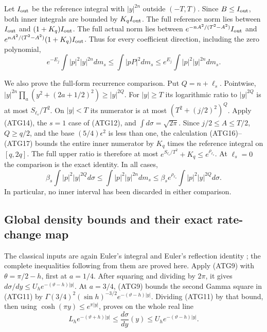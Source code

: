\documentclass[11pt,a4paper]{article}
\begin{document}
Let $I_{\rm out}$ be the reference integral with $|y|^{2n}$
outside $(-T,T)$. Since $B\le I_{\rm out}$, both inner integrals
are bounded by $K_q I_{\rm out}$. The full reference norm lies
between $I_{\rm out}$ and $(1+K_q)I_{\rm out}$.
The full actual norm lies between
$e^{-nA^2/(T^2-A^2)}I_{\rm out}$ and
$e^{nA^2/(T^2-A^2)}(1+K_q)I_{\rm out}$.
Thus for every coefficient direction, including the zero polynomial,
\[
 e^{-E_j}\int|p|^2|y|^{2n}dm_s
 \le\int|pP|^2dm_s
 \le e^{E_j}\int|p|^2|y|^{2n}dm_s.
\tag{ATG18}
\]

We also prove the full-form recurrence comparison. Put $Q=n+\ell_s$.
Pointwise,
$|y|^{2n}\prod_a(y^2+(2a+1/2)^2)\ge |y|^{2Q}$.
For $|y|\ge T$ its logarithmic ratio to $|y|^{2Q}$ is at most
$S_{\ell_s}/T^2$. On $|y|<T$ its numerator is at most
$(T^2+(j/2)^2)^Q$.
Apply (ATG14), the $s=1$ case of (ATG12), and
$\int d\sigma=\sqrt{2\pi}$. Since $j/2\le A\le T/2$,
$Q\ge q/2$, and the base $(5/4)\epsilon^2$ is less than one,
the calculation (ATG16)--(ATG17) bounds the entire inner numerator
by $K_q$ times the reference integral on $[q,2q]$.
The full upper ratio is therefore at most
$e^{S_{\ell_s}/T^2}+K_q\le e^{\rho_{\ell_s}}$.
At $\ell_s=0$ the comparison is the exact identity. In all cases,
\[
 \beta_s\int|p|^2|y|^{2Q}d\sigma
 \le\int|p|^2|y|^{2n}dm_s
 \le\beta_s e^{\rho_{\ell_s}}\int|p|^2|y|^{2Q}d\sigma.
\tag{ATG19}
\]
In particular, no inner interval has been discarded in either
comparison.

\subsection{Global density bounds and their exact rate-change map}

The classical inputs are again Euler's integral and Euler's
reflection identity \cite[eqs.~(5.2.1), (5.5.3)]{human:dlmf5};
the complete inequalities following from them are proved here.
Apply (ATG9) with $\theta=\pi/2-h$, first at $a=1/4$.
After squaring and dividing by $2\pi$, it gives
$d\sigma/dy\le U_he^{-(\vartheta-h)|y|}$.
At $a=3/4$, (ATG9) bounds the second Gamma square in (ATG11)
by $\Gamma(3/4)^2(\sin h)^{-3/2}e^{-(\vartheta-h)|y|}$.
Dividing (ATG11) by that bound, then using
$\cosh(\pi y)\le e^{\pi|y|}$, proves on the whole real line
\[
 L_he^{-(\vartheta+h)|y|}
 \le\frac{d\sigma}{dy}(y)
 \le U_he^{-(\vartheta-h)|y|}.
\tag{ATG20}
\]
\end{document}
